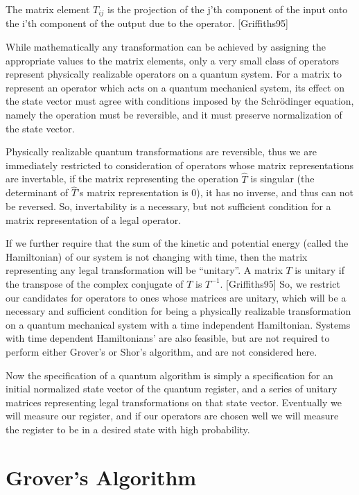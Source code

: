 \documentclass[]{article}
\begin{document}
The matrix element $T_{ij}$ is the projection of the j'th component of
the input onto the i'th component of the output due to the
operator. [Griffiths95]

While mathematically any transformation can be achieved by assigning
the appropriate values to the matrix elements, only a very small class
of operators represent physically realizable operators on a quantum
system.  For a matrix to represent an operator which acts on a quantum
mechanical system, its effect on the state vector must agree with
conditions imposed by the Schr\"{o}dinger equation, namely the
operation must be reversible, and it must preserve normalization of
the state vector.

Physically realizable quantum transformations are reversible, thus we
are immediately restricted to consideration of operators whose matrix
representations are invertable, if the matrix representing the
operation $\hat{T}$ is singular (the determinant of $\hat{T}$'s matrix
representation is 0), it has no inverse, and thus can not be reversed.
So, invertability is a necessary, but not sufficient condition for a
matrix representation of a legal operator.

If we further require that the sum of the kinetic and potential energy
(called the Hamiltonian) of our system is not changing with time, then
the matrix representing any legal transformation will be ``unitary''.
A matrix $T$ is unitary if the transpose of the complex conjugate of
$T$ is $T^{-1}$.  [Griffiths95] So, we restrict our candidates for
operators to ones whose matrices are unitary, which will be a
necessary and sufficient condition for being a physically realizable
transformation on a quantum mechanical system with a time independent
Hamiltonian.  Systems with time dependent Hamiltonians' are also
feasible, but are not required to perform either Grover's or Shor's
algorithm, and are not considered here.

Now the specification of a quantum algorithm is simply a specification
for an initial normalized state vector of the quantum register, and a
series of unitary matrices representing legal transformations on that
state vector.  Eventually we will measure our register, and if our
operators are chosen well we will measure the register to be in a
desired state with high probability.

\section{Grover's Algorithm}
\end{document}
